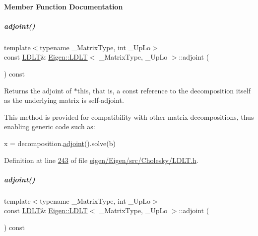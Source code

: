 \paragraph{Member Function Documentation}
\mbox{\label{group___cholesky___module_ac656a209860fa0c6a8faa8bb9f9a06ef}} 
\subparagraph{\texorpdfstring{adjoint()}{adjoint()}\hspace{0.1cm}{\footnotesize\ttfamily [1/2]}}
{\footnotesize\ttfamily template$<$typename \+\_\+\+Matrix\+Type, int \+\_\+\+Up\+Lo$>$ \\
const \hyperlink{group___cholesky___module_class_eigen_1_1_l_d_l_t}{L\+D\+LT}\& \hyperlink{group___cholesky___module_class_eigen_1_1_l_d_l_t}{Eigen\+::\+L\+D\+LT}$<$ \+\_\+\+Matrix\+Type, \+\_\+\+Up\+Lo $>$\+::adjoint (\begin{DoxyParamCaption}{ }\end{DoxyParamCaption}) const\hspace{0.3cm}{\ttfamily [inline]}}

\begin{DoxyReturn}{Returns}
the adjoint of {\ttfamily $\ast$this}, that is, a const reference to the decomposition itself as the underlying matrix is self-\/adjoint.
\end{DoxyReturn}
This method is provided for compatibility with other matrix decompositions, thus enabling generic code such as\+: 
\begin{DoxyCode}
x = decomposition.\hyperlink{group___core___module_afacca1f88da57e5cd87dd07c8ff926bb}{adjoint}().solve(b) 
\end{DoxyCode}
 

Definition at line \hyperlink{eigen_2_eigen_2src_2_cholesky_2_l_d_l_t_8h_source_l00243}{243} of file \hyperlink{eigen_2_eigen_2src_2_cholesky_2_l_d_l_t_8h_source}{eigen/\+Eigen/src/\+Cholesky/\+L\+D\+L\+T.\+h}.

\mbox{\label{group___cholesky___module_ac656a209860fa0c6a8faa8bb9f9a06ef}} 
\subparagraph{\texorpdfstring{adjoint()}{adjoint()}\hspace{0.1cm}{\footnotesize\ttfamily [2/2]}}
{\footnotesize\ttfamily template$<$typename \+\_\+\+Matrix\+Type, int \+\_\+\+Up\+Lo$>$ \\
const \hyperlink{group___cholesky___module_class_eigen_1_1_l_d_l_t}{L\+D\+LT}\& \hyperlink{group___cholesky___module_class_eigen_1_1_l_d_l_t}{Eigen\+::\+L\+D\+LT}$<$ \+\_\+\+Matrix\+Type, \+\_\+\+Up\+Lo $>$\+::adjoint (\begin{DoxyParamCaption}{ }\end{DoxyParamCaption}) const\hspace{0.3cm}{\ttfamily [inline]}}

